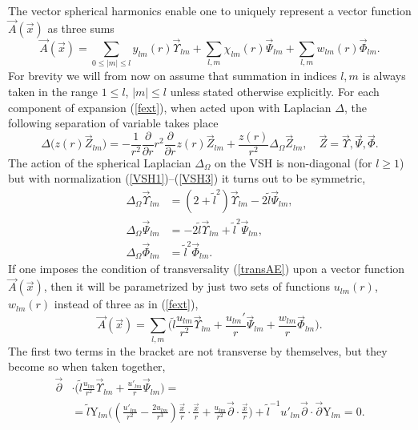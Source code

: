 \documentclass[12pt]{article}
\newcommand{\pl}{\partial}
\newcommand{\plr}{\partial r}
\newcommand{\Dtph}{\Delta_{\Omega}}
\newcommand{\YY}{\mathrm{Y}}
\begin{document}
	The vector spherical harmonics enable one to uniquely represent
	a vector function
$ \vec{A}(\vec{x}) $
	as three sums
\begin{equation}
\label{fext}
    \vec{A}(\vec{x}) =
        \sum_{0\leq |m| \leq l} y_{lm}(r) \vec{\Upsilon}_{lm} +
        \sum_{l,m} \chi_{lm}(r) \vec{\Psi}_{lm} +
        \sum_{l,m} w_{lm}(r) \vec{\Phi}_{lm} .
\end{equation}
	For brevity we will from now on assume that summation in indices
$ l,m $
	is always taken in the range
$ 1 \leq l $, 
$ |m| \leq l $
	unless stated otherwise explicitly.
	For each component of expansion
(\ref{fext}),
	when acted upon with Laplacian
$ \Delta $,
	the following separation of variable takes place
\begin{equation*}
    \Delta \bigl(z(r) \vec{Z}_{lm}\bigr) =
-\frac{1}{r^{2}} \frac{\pl}{\plr} r^{2} \frac{\pl}{\plr} z(r) \vec{Z}_{lm}
        + \frac{z(r)}{r^{2}} \Dtph \vec{Z}_{lm}, \quad
            \vec{Z} = \vec{\Upsilon}, \vec{\Psi}, \vec{\Phi} .
\end{equation*}
	The action of the spherical Laplacian
$ \Dtph $
	on the VSH is non-diagonal (for
$ l \geq 1 $)
	but with normalization
(\ref{VSH1})--(\ref{VSH3})
	it turns out to be symmetric,
\begin{align*}
    \Dtph \vec{\Upsilon}_{lm} &= (2+\tilde{l}^{2}) \vec{\Upsilon}_{lm}
            - 2 \tilde{l} \vec{\Psi}_{lm} ,\\
                  \Dtph \vec{\Psi}_{lm} &= -2 \tilde{l}
\vec{\Upsilon}_{lm}
            + \tilde{l}^{2} \vec{\Psi}_{lm} ,\\
    \Dtph \vec{\Phi}_{lm} &= \tilde{l}^{2} \vec{\Phi}_{lm} .
\end{align*}
	If one imposes the condition of transversality
(\ref{transAE})
	upon a vector function
$ \vec{A}(\vec{x}) $,
	then it will be parametrized by just two sets of functions
$ u_{lm}(r) $,
$ w_{lm}(r) $
	instead of three as in 
(\ref{fext}),
\begin{equation}
\label{Atrexp}
    \vec{A}(\vec{x}) =
        \sum_{l,m} \bigl(\tilde{l}
	    \frac{u_{lm}}{r^{2}} \vec{\Upsilon}_{lm} +
        \frac{u_{lm}'}{r} \vec{\Psi}_{lm} 
    +   \frac{w_{lm}}{r} \vec{\Phi}_{lm} \bigr) .
\end{equation}
	The first two terms in the bracket are not transverse by themselves,
	but they become so when taken together,
\begin{align}
\label{treq}
    \vec{\pl} &\cdot
\bigl(\tilde{l}\frac{u_{lm}}{r^{2}}\vec{\Upsilon}_{lm}
        +\frac{u'_{lm}}{r}\vec{\Psi}_{lm}\bigr) =\\
\nonumber
    &= \tilde{l} \YY_{lm}
        \bigl( (\frac{u'_{lm}}{r^{2}}-\frac{2u_{lm}}{r^{3}})
        \frac{\vec{x}}{r}\cdot\frac{\vec{x}}{r} 
    + \frac{u_{lm}}{r^{2}} \vec{\pl}\cdot \frac{\vec{x}}{r} \bigr) 
    + \tilde{l}^{-1} u'_{lm} \vec{\pl}\cdot\vec{\pl} \YY_{lm} = 0 .
\end{align}
\end{document}
